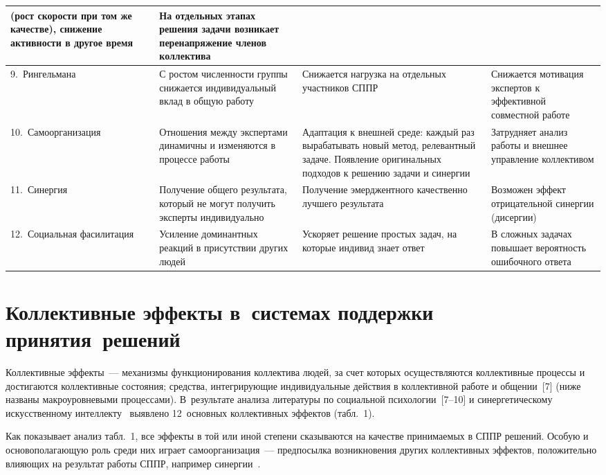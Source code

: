 \begin{multicols}{2}
\begin{table*}[b]
\begin{center}
\begin{tabular}{|p{19mm}|p{40mm}|p{44mm}|p{46mm}|}
(рост скорости при том же качестве), снижение активности в другое время&На отдельных этапах решения 
задачи возникает перенапряжение членов коллектива\\
\hline
9.~Рингельмана&С ростом численности группы снижается индивидуальный вклад в общую работу&Снижается 
нагрузка на отдельных участников СППР&Снижается мотивация экспертов к эффективной совместной работе\\
\hline
10.~Само\-ор\-га\-ни\-за\-ция&Отношения между экспертами динамичны и изменяются в процессе работы&
Адаптация к 
внешней среде: каж\-дый раз вырабатывать новый метод, релевантный задаче. Появление оригинальных 
подходов к решению задачи и синергии&Затрудняет анализ работы и внешнее управление коллективом\\
\hline
11.~Синергия&Получение общего результата, который не могут получить эксперты индивидуально&Получение 
эмерджентного качественно лучшего результата&Возможен эффект отрицательной синергии (дисергии) \\
\hline
12.~Социальная фасилитация &Усиление доминантных реакций в присутствии других людей &Ускоряет решение 
простых задач, на которые индивид знает ответ&В сложных задачах повышает вероятность ошибочного 
ответа\\
\hline
\end{tabular}
\end{center}
\vspace*{-12pt}
\end{table*}
   
\section{Коллективные эффекты в~системах поддержки 
принятия~решений}
  
  Коллективные эффекты~--- механизмы функционирования коллектива 
людей, за счет которых осуществляются коллективные процессы и достигаются 
коллективные состояния; средства, интегрирующие индивидуальные действия 
в коллективной работе и общении~[7] (ниже названы макро\-уровневыми 
процессами). В~результате анализа литературы по социальной 
  психологии~[7--10] и синергетическому искусственному 
  интеллекту~\cite{5-lis, 11-lis, 12-lis} выявлено 12~основных коллективных 
эффектов (табл.~1).
  
  Как показывает анализ табл.~1, все эффекты в той или иной степени 
сказываются на качестве принимаемых в СППР решений. Особую и 
основополагающую роль среди них играет самоорганизация~--- предпосылка 
возникновения других коллективных эффектов, положительно влияющих на 
результат работы СППР, например синергии~\cite{5-lis}.




\end{multicols}
